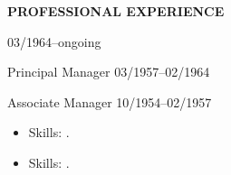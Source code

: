 


\vspace{\spaceSection}
\begin{center}
    \textbf{PROFESSIONAL EXPERIENCE}
\end{center}
\vspace{\spaceSection}

\textbf{\expBCompany} \hfill \expBLocation

\textbf{\expBPosition} \hfill 03/1964--ongoing

Principal Manager \hfill 03/1957--02/1964

Associate Manager \hfill 10/1954--02/1957

\begin{itemize}[noitemsep, topsep=0pt, partopsep=0pt, parsep=0pt]
    \expBDetails
    \item Skills: \expBTechStack.
\end{itemize}

\vspace{\spaceSection}

\textbf{\expACompany} \hfill \expALocation

\expAPosition \hfill \expADate 

\begin{itemize}[noitemsep, topsep=0pt, partopsep=0pt, parsep=0pt]
    \expADetails
    \item Skills: \expATechStack.
\end{itemize}
